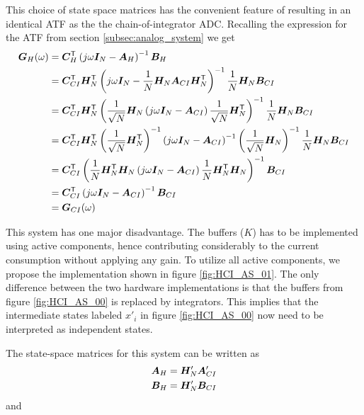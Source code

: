 This choice of state space matrices has the convenient feature of resulting in an identical ATF as the the chain-of-integrator ADC. Recalling the expression for the ATF from section \ref{subsec:analog_system} we get
\begin{align}
    \bm{G}_H(\omega) & = \bm{C}^\mathsf{T}_H \left( j\omega \bm{I}_{N} - \bm{A}_H \right)^{-1} \bm{B}_H \\
    & = \bm{C}^\mathsf{T}_{CI} \bm{H_}{N}^\mathsf{T} \left( j\omega \bm{I}_{N} - \frac{1}{N}\bm{H_}{N}\bm{A}_{CI}\bm{H_}{N}^\mathsf{T} \right)^{-1} \frac{1}{N}\bm{H_}{N}\bm{B}_{CI} \\
    & = \bm{C}^\mathsf{T}_{CI} \bm{H_}{N}^\mathsf{T} \left( \frac{1}{\sqrt{N}}\bm{H_}{N} \left( j\omega \bm{I}_{N} - \bm{A}_{CI} \right) \frac{1}{\sqrt{N}}\bm{H_}{N}^\mathsf{T} \right)^{-1} \frac{1}{N}\bm{H_}{N}\bm{B}_{CI} \\
    & = \bm{C}^\mathsf{T}_{CI} \bm{H_}{N}^\mathsf{T} \left( \frac{1}{\sqrt{N}}\bm{H_}{N}^\mathsf{T} \right)^{-1} \left( j\omega \bm{I}_{N} - \bm{A}_{CI} \right)^{-1} \left( \frac{1}{\sqrt{N}}\bm{H_}{N} \right)^{-1}\frac{1}{N}\bm{H_}{N}\bm{B}_{CI} \\
    & = \bm{C}^\mathsf{T}_{CI} \left( \frac{1}{N}\bm{H_}{N}^\mathsf{T}\bm{H_}{N} \left( j\omega \bm{I}_{N} - \bm{A}_{CI} \right) \frac{1}{N}\bm{H_}{N}^\mathsf{T}\bm{H_}{N} \right)^{-1} \bm{B}_{CI} \\
    & = \bm{C}^\mathsf{T}_{CI} \left( j\omega \bm{I}_{N} - \bm{A}_{CI} \right)^{-1} \bm{B}_{CI} \\
    & = \bm{G}_{CI}(\omega)
\end{align}



\begin{sidewaysfigure}[htbp]
    \begin{center}
        
    \end{center}
    \caption{One possible hardware implementation of the Hadamard ADC AS for $N=4$}
    \label{fig:HCI_AS_00}
\end{sidewaysfigure}

This system has one major disadvantage. The buffers ($K$) has to be implemented using active components, hence contributing considerably to the current consumption without applying any gain. To utilize all active components, we propose the implementation shown in figure \ref{fig:HCI_AS_01}.
The only difference between the two hardware implementations is that the buffers from figure \ref{fig:HCI_AS_00} is replaced by integrators. This implies that the intermediate states labeled $x'_i$ in figure \ref{fig:HCI_AS_00} now need to be interpreted as independent states.

The state-space matrices for this system can be written as
\begin{align}
    \bm{A}_H & = \bm{H}'_N \bm{A}'_{CI} \\
    \bm{B}_H & = \bm{H}'_N \bm{B}_{CI}
\end{align}
and

